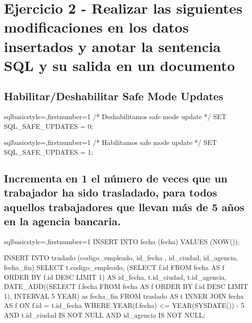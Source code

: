 \section{Ejercicio 2 - Realizar las siguientes modificaciones en los datos insertados y anotar la sentencia SQL y su salida en un documento}
	\subsection{Habilitar/Deshabilitar Safe Mode Updates}
		\begin{sourcecodep}[]{sql}{basicstyle={\fontsize{10}{10}\selectfont\ttfamily},firstnumber=1}{}
			/* Deshabilitamos safe mode update */
			SET SQL_SAFE_UPDATES = 0;\end{sourcecodep}
		\begin{sourcecodep}[]{sql}{basicstyle={\fontsize{10}{10}\selectfont\ttfamily},firstnumber=1}{}
			/* Habilitamos safe mode update */
			SET SQL_SAFE_UPDATES = 1;\end{sourcecodep}
	\subsection{Incrementa en 1 el número de veces que un trabajador ha sido trasladado, para todos aquellos trabajadores que llevan más de 5 años en la agencia bancaria.
}
		\begin{sourcecodep}[]{sql}{basicstyle={\fontsize{10}{10}\selectfont\ttfamily},firstnumber=1}{}
			INSERT INTO fecha (fecha) VALUES (NOW());
			
			INSERT INTO traslado (codigo_empleado, id_fecha , id_ciudad, id_agencia, fecha_fin)
			SELECT t.codigo_empleado, (SELECT f.id FROM fecha AS f ORDER BY f.id DESC LIMIT 1) AS id_fecha,  t.id_ciudad, t.id_agencia, DATE_ADD((SELECT f.fecha FROM fecha AS f ORDER BY f.id DESC LIMIT 1), INTERVAL 5 YEAR) as fecha_fin
				FROM traslado AS t
				INNER JOIN fecha AS f ON f.id = t.id_fecha
				WHERE YEAR(f.fecha) <= YEAR(SYSDATE()) - 5
					AND t.id_ciudad IS NOT NULL
					AND id_agencia  IS NOT NULL;\end{sourcecodep}
